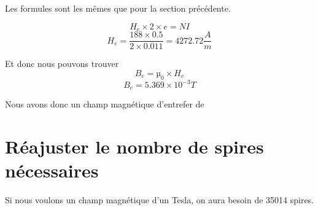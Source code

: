 \documentclass{report}
\begin{document}
Les formules sont les mêmes que pour la section précédente.

\[H_{e} \times 2 \times e = NI\]
\[H_{e} = \frac{188 \times 0.5}{2 \times 0.011} = 4272.72 \frac{A}{m}\]

Et donc nous pouvons trouver \[ B_{e} = µ_{0} \times H_{e}\]
\[B_{e} = 5.369 \times 10^{-3} T\]

Nous avons donc un champ magnétique d'entrefer de 

\section{Réajuster le nombre de spires nécessaires}

Si nous voulons un champ magnétique d'un Tesla, on aura besoin de 35014 spires.
\end{document}

